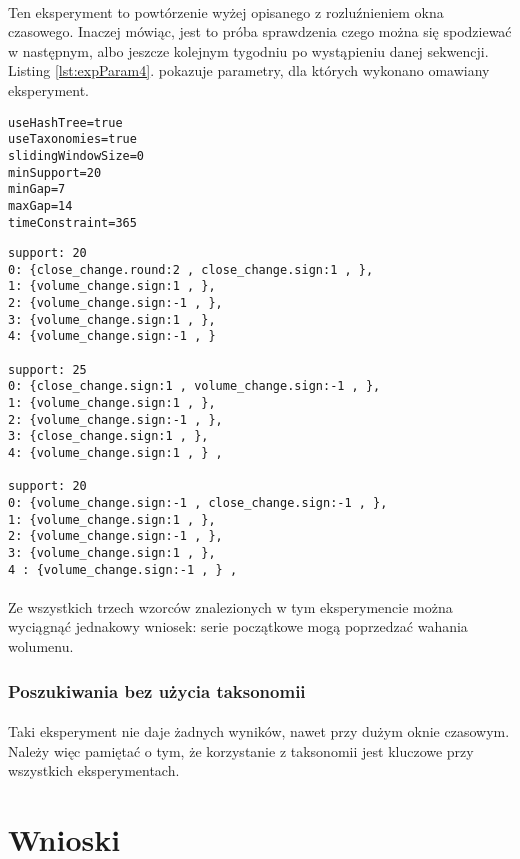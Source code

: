 \documentclass[11pt,a4paper]{article}
\begin{document}
\paragraph{}Ten eksperyment to powtórzenie wyżej opisanego z rozluźnieniem okna czasowego. Inaczej mówiąc, jest to próba sprawdzenia czego można się spodziewać w następnym, albo jeszcze kolejnym tygodniu po wystąpieniu danej sekwencji. Listing \ref{lst:expParam4}. pokazuje parametry, dla których wykonano omawiany eksperyment.
\begin{lstlisting}[caption={Parametry, eksperyment 4},label={lst:expParam4}]
useHashTree=true
useTaxonomies=true
slidingWindowSize=0
minSupport=20
minGap=7
maxGap=14
timeConstraint=365
\end{lstlisting}
\begin{lstlisting}[caption={Wzorce, eksperyment 4},label={lst:expRes4}]
support: 20
0: {close_change.round:2 , close_change.sign:1 , },
1: {volume_change.sign:1 , },
2: {volume_change.sign:-1 , },
3: {volume_change.sign:1 , },
4: {volume_change.sign:-1 , }

support: 25
0: {close_change.sign:1 , volume_change.sign:-1 , },
1: {volume_change.sign:1 , },
2: {volume_change.sign:-1 , },
3: {close_change.sign:1 , },
4: {volume_change.sign:1 , } ,

support: 20
0: {volume_change.sign:-1 , close_change.sign:-1 , },
1: {volume_change.sign:1 , },
2: {volume_change.sign:-1 , },
3: {volume_change.sign:1 , },
4 : {volume_change.sign:-1 , } ,
\end{lstlisting}
\paragraph{}Ze wszystkich trzech wzorców znalezionych w tym eksperymencie można wyciągnąć jednakowy wniosek: serie początkowe mogą poprzedzać wahania wolumenu.

\subsubsection{Poszukiwania bez użycia taksonomii}
\paragraph{}Taki eksperyment nie daje żadnych wyników, nawet przy dużym oknie czasowym. Należy więc pamiętać o tym, że korzystanie z taksonomii jest kluczowe przy wszystkich eksperymentach.
\newpage
\section{Wnioski}
\end{document}
